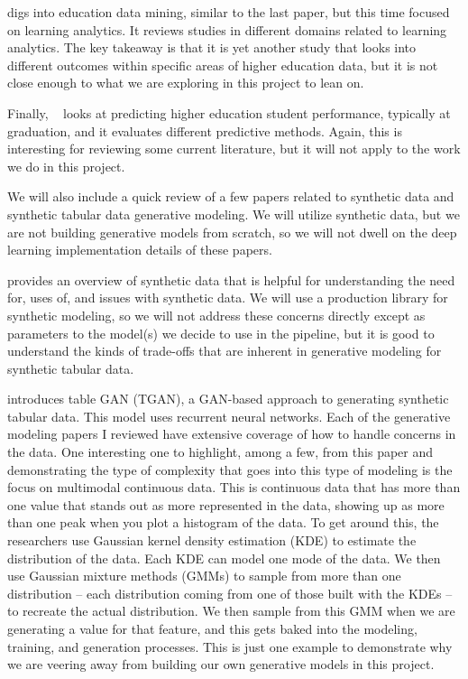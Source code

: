 \documentclass[sigconf, authorversion, nonacm]{acmart}
\begin{document}
    \cite{ALDOWAH201913} digs into education data mining, similar to the last paper, but this time focused on learning analytics. It reviews studies in different domains related to learning analytics. The key takeaway is that it is yet another study that looks into different outcomes within specific areas of higher education data, but it is not close enough to what we are exploring in this project to lean on.

    Finally, ~\cite{https://doi.org/10.1155/2022/8924028} looks at predicting higher education student performance, typically at graduation, and it evaluates different predictive methods. Again, this is interesting for reviewing some current literature, but it will not apply to the work we do in this project.

    We will also include a quick review of a few papers related to synthetic data and synthetic tabular data generative modeling. We will utilize synthetic data, but we are not building generative models from scratch, so we will not dwell on the deep learning implementation details of these papers.

    \cite{decristofaro2024syntheticdatamethodsuse} provides an overview of synthetic data that is helpful for understanding the need for, uses of, and issues with synthetic data. We will use a production library for synthetic modeling, so we will not address these concerns directly except as parameters to the model(s) we decide to use in the pipeline, but it is good to understand the kinds of trade-offs that are inherent in generative modeling for synthetic tabular data.

    \cite{DBLP:journals/corr/abs-1811-11264} introduces table GAN (TGAN), a GAN-based approach to generating synthetic tabular data. This model uses recurrent neural networks. Each of the generative modeling papers I reviewed have extensive coverage of how to handle concerns in the data. One interesting one to highlight, among a few, from this paper and demonstrating the type of complexity that goes into this type of modeling is the focus on multimodal continuous data. This is continuous data that has more than one value that stands out as more represented in the data, showing up as more than one peak when you plot a histogram of the data. To get around this, the researchers use Gaussian kernel density estimation (KDE) to estimate the distribution of the data. Each KDE can model one mode of the data. We then use Gaussian mixture methods (GMMs) to sample from more than one distribution -- each distribution coming from one of those built with the KDEs -- to recreate the actual distribution. We then sample from this GMM when we are generating a value for that feature, and this gets baked into the modeling, training, and generation processes. This is just one example to demonstrate why we are veering away from building our own generative models in this project.
\end{document}
